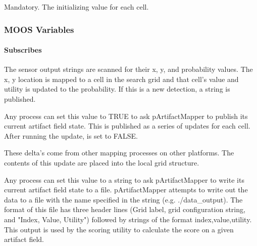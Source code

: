 \begin{hangpar}{\pin}{}
Mandatory. The initializing value for each cell.
\end{hangpar}

\subsubsection{MOOS Variables}
\paragraph{Subscribes}
\begin{hangpar}{\pin}{}
The sensor output strings are scanned for their x, y, and probability values.  The x, y location is mapped to a cell in the search grid and that cell's value and utility is updated to the probability.  If this is a new detection, a  string is published.
\end{hangpar}
\begin{hangpar}{\pin}{}
Any process can set this value to TRUE to ask pArtifactMapper to publish its current artifact field state.  This is published as a series of  updates for each cell.  After running the update,  is set to FALSE.
\end{hangpar}
\begin{hangpar}{\pin}{}
These delta's come from other mapping processes on other platforms.  The contents of this update are placed into the local grid structure.
\end{hangpar}
\begin{hangpar}{\pin}{}
Any process can set this value to a string to ask pArtifactMapper to write its current artifact field state to a file.  pArtifactMapper attempts to write out the data to a file with the name specified in the string (e.g. ./data\_output).  The format of this file has three header lines (Grid label, grid configuration string, and "Index, Value, Utility") followed by strings of the format index,value,utility.  This output is used by the scoring utility to calculate the score on a given artifact field.
\end{hangpar}
